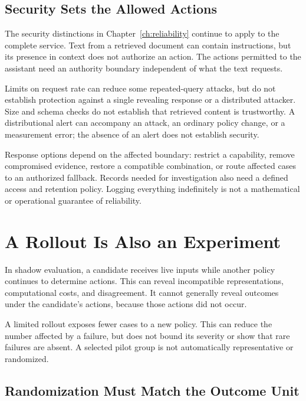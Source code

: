 \subsection{Security Sets the Allowed Actions}
\label{sec:security-boundaries}

The security distinctions in Chapter~\ref{ch:reliability} continue to apply to the complete service. Text from a retrieved document can contain instructions, but its presence in context does not authorize an action. The actions permitted to the assistant need an authority boundary independent of what the text requests.

Limits on request rate can reduce some repeated-query attacks, but do not establish protection against a single revealing response or a distributed attacker. Size and schema checks do not establish that retrieved content is trustworthy. A distributional alert can accompany an attack, an ordinary policy change, or a measurement error; the absence of an alert does not establish security.

Response options depend on the affected boundary: restrict a capability, remove compromised evidence, restore a compatible combination, or route affected cases to an authorized fallback. Records needed for investigation also need a defined access and retention policy. Logging everything indefinitely is not a mathematical or operational guarantee of reliability.

\section{A Rollout Is Also an Experiment}

In shadow evaluation, a candidate receives live inputs while another policy continues to determine actions. This can reveal incompatible representations, computational costs, and disagreement. It cannot generally reveal outcomes under the candidate's actions, because those actions did not occur.

A limited rollout exposes fewer cases to a new policy. This can reduce the number affected by a failure, but does not bound its severity or show that rare failures are absent. A selected pilot group is not automatically representative or randomized.

\subsection{Randomization Must Match the Outcome Unit}

